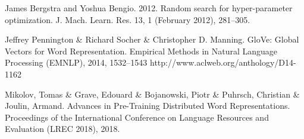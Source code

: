 \documentclass[11pt,twocolumn]{article}
\begin{document}
\begin{thebibliography}{9}
        James Bergstra and Yoshua Bengio. 2012. Random search for hyper-parameter optimization. J. Mach. Learn.
        Res. 13, 1 (February 2012), 281–305.

        Jeffrey Pennington \& Richard Socher \& Christopher D. Manning. GloVe: Global Vectors for Word
        Representation. Empirical Methods in Natural Language Processing (EMNLP), 2014, 1532--1543
        http://www.aclweb.org/anthology/D14-1162

        Mikolov, Tomas \& Grave, Edouard \& Bojanowski, Piotr \& Puhrsch, Christian \& Joulin, Armand.
        Advances in Pre-Training Distributed Word Representations. Proceedings of the International Conference
        on Language Resources and Evaluation (LREC 2018), 2018.
    \end{thebibliography}
\end{document}
